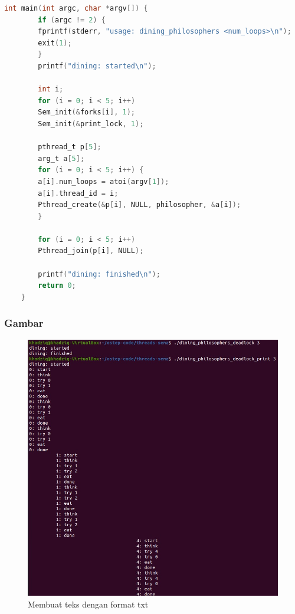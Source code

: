 \documentclass[11pt,a4paper]{article}
\begin{document}
\begin{lstlisting}[language=C, caption=Captionnya tulis di sini class,label={labelkode}]
    int main(int argc, char *argv[]) {
        if (argc != 2) {
	    fprintf(stderr, "usage: dining_philosophers <num_loops>\n");
	    exit(1);
        }
        printf("dining: started\n");
    
        int i;
        for (i = 0; i < 5; i++) 
	    Sem_init(&forks[i], 1);
        Sem_init(&print_lock, 1);

        pthread_t p[5];
        arg_t a[5];
        for (i = 0; i < 5; i++) {
	    a[i].num_loops = atoi(argv[1]);
	    a[i].thread_id = i;
	    Pthread_create(&p[i], NULL, philosopher, &a[i]);
        }

        for (i = 0; i < 5; i++) 
	    Pthread_join(p[i], NULL); 

        printf("dining: finished\n");
        return 0;
    }
    \end{lstlisting}
\subsubsection{Gambar}
    \begin{figure}[h]
        \centering
        \includegraphics[scale = 0.2]{Figure/dining deadlock.png}
        \caption{Membuat teks dengan format txt}
        \label{fig:asg8_1}
    \end{figure}
    \newline
\end{document}
